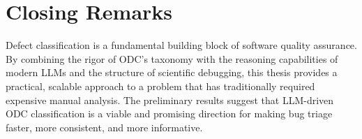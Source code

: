 \documentclass{iutbscthesis}
\begin{document}
\section{Closing Remarks}

Defect classification is a fundamental building block of software quality assurance. By combining the rigor of ODC's taxonomy with the reasoning capabilities of modern LLMs and the structure of scientific debugging, this thesis provides a practical, scalable approach to a problem that has traditionally required expensive manual analysis. The preliminary results suggest that LLM-driven ODC classification is a viable and promising direction for making bug triage faster, more consistent, and more informative.



\printbib
\end{document}
